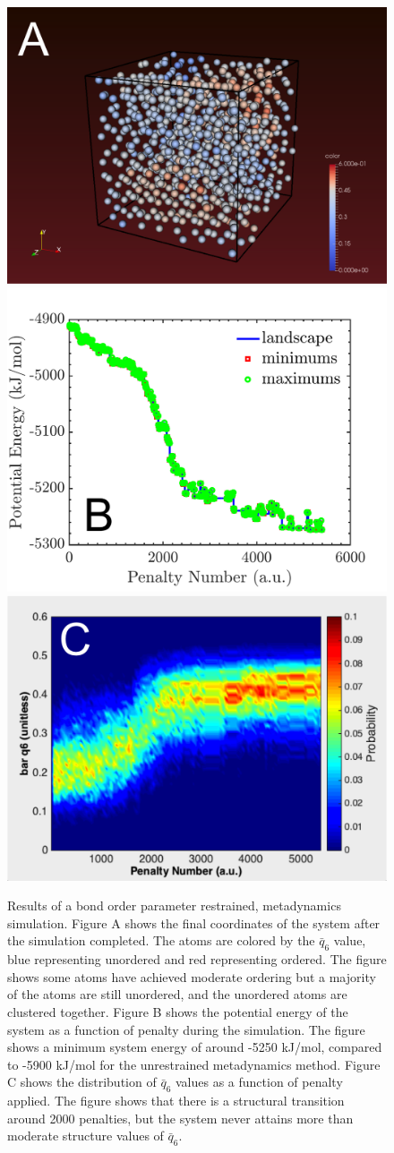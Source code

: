 \begin{figure}[h]
	\centering
	\includegraphics[width = .4\textwidth]{./Figures/Appendix/bop_restrain.png}
	\hspace{.1\textwidth}
	\includegraphics[width = .4\textwidth]{./Figures/Appendix/bop_landscape.pdf}
	\\
	\vspace{5mm}
	\includegraphics[width = .4\textwidth]{./Figures/Appendix/bop_heatplot.png}
	\caption{Results of a bond order parameter restrained, metadynamics simulation.  Figure A shows the final coordinates of the system after the simulation completed.  The atoms are colored by the $\bar{q}_6$ value, blue representing unordered and red representing ordered.  The figure shows some atoms have achieved moderate ordering but a majority of the atoms are still unordered, and the unordered atoms are clustered together.  Figure B shows the potential energy of the system as a function of penalty during the simulation.  The figure shows a minimum system energy of around -5250 kJ/mol, compared to -5900 kJ/mol for the unrestrained metadynamics method.  Figure C shows the distribution of $\bar{q}_6$ values as a function of penalty applied.  The figure shows that there is a structural transition around 2000 penalties, but the system never attains more than moderate structure values of $\bar{q}_6$.}
	\label{bop_final}
\end{figure}

